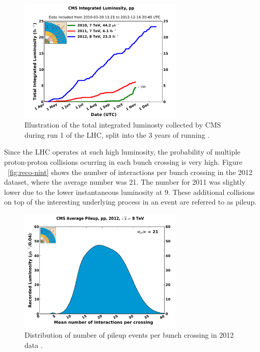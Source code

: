 \begin{figure}[htbp]
   \includegraphics[width=0.7\textwidth]{plots/detector/int_lumi_cumulative_pp_2.pdf}
\caption{Illustration of the total integrated luminosty collected by CMS during run 1 of the
LHC, split into the 3 years of running \cite{cmslumitwiki}.}
\label{fig:detlumi}
\end{figure}

Since the LHC operates at such high luminosity, the probability of multiple
proton-proton collisions ocurring in each bunch crossing is very high. Figure
~\ref{fig:reco-nint} shows the number of interactions per bunch crossing in the
2012 dataset, where the average number was 21. The number for 2011 was slightly
lower due to the lower instantaneous luminosity at 9. 
These additional collisions on top of the interesting
underlying process in an event are referred to as pileup.

\begin{figure}[htbp]
   \includegraphics[width=0.7\textwidth]{plots/detector/pileup_pp_2012-2.pdf}
\caption{Distribution of number of pileup events per bunch crossing in 2012 data \cite{cmslumitwiki}.}
\label{fig:detlumi}
\end{figure}

